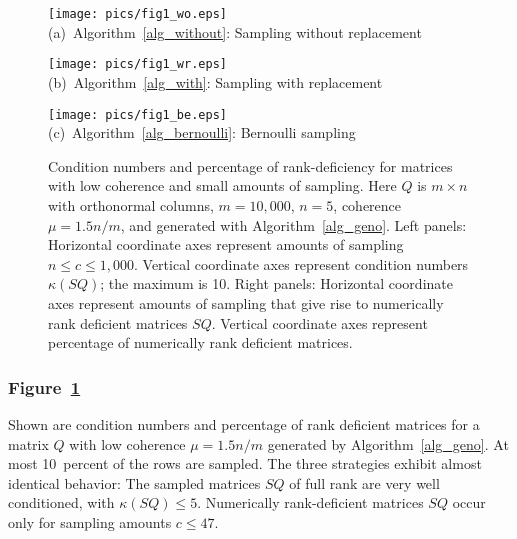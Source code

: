 \documentclass{siamltex}
\begin{document}
\begin{figure}  
\begin{center}
\resizebox{4.3in}{!}
{\texttt{[image: pics/fig1\_wo.eps]}} \\
{{{\footnotesize{{(a)\ Algorithm~\ref{alg_without}: Sampling without replacement}}}}}
\end{center}
\begin{center}
\resizebox{4.3in}{!}
{\texttt{[image: pics/fig1\_wr.eps]}} \\
{{{\footnotesize{{(b)\ Algorithm~\ref{alg_with}: Sampling with replacement}}}}}
\end{center}
\begin{center}
\resizebox{4.3in}{!}
{\texttt{[image: pics/fig1\_be.eps]}} \\
{{{\footnotesize{{(c)\ Algorithm~\ref{alg_bernoulli}: Bernoulli sampling}}}}}
\end{center}
\caption{Condition numbers and percentage of rank-deficiency for matrices
with low coherence and small amounts of sampling. 
Here $Q$ is $m\times n$ with orthonormal 
columns, $m=10,000$, $n=5$, coherence $\mu=1.5n/m$, and generated with
Algorithm~\ref{alg_geno}.
Left panels: Horizontal coordinate axes represent amounts of sampling 
$n\leq c\leq 1,000$. Vertical coordinate axes represent
condition numbers $\kappa(SQ)$; the maximum is 10.
Right panels: Horizontal coordinate axes represent amounts of sampling that
give rise to numerically rank deficient matrices $SQ$.  
Vertical coordinate axes represent percentage of
numerically rank deficient matrices.
}\label{f_fig1}
\end{figure}

\subsubsection*{Figure~\ref{f_fig1}} Shown are condition numbers and 
percentage of rank deficient matrices for 
a matrix $Q$ with low coherence $\mu=1.5n/m$
generated by Algorithm~\ref{alg_geno}. At most 
10~percent of the rows are sampled.
The three strategies exhibit almost identical behavior:
The sampled matrices $SQ$ of full rank are very well
conditioned, with $\kappa(SQ)\leq 5$. Numerically 
rank-deficient matrices $SQ$ occur only for sampling amounts  $c\leq 47$.
\end{document}
